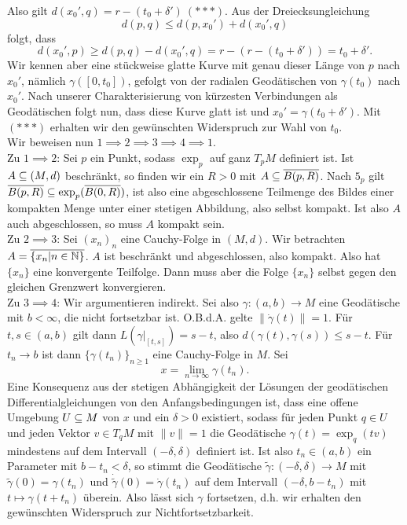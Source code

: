 \begin{beweis}
\begin{equation}
\end{equation}
Also gilt $d(x_0', q) = r - (t_0 + \delta') \ (\ast \ast \ast)$. Aus der Dreiecksungleichung
\begin{equation}
d(p,q) \leq d(p, x_0') + d(x_0', q)
\end{equation}
folgt, dass
\begin{equation}
d(x_0', p) \geq d(p,q)-d(x_0',q) = r-(r-(t_0+\delta')) = t_0 + \delta'.
\end{equation}
Wir kennen aber eine stückweise glatte Kurve mit genau dieser Länge von $p$ nach $x_0'$, nämlich $\gamma([0,t_0])$, gefolgt von der radialen Geodätischen von $\gamma(t_0)$ nach $x_0'$. Nach unserer Charakterisierung von kürzesten Verbindungen als Geodätischen folgt nun, dass diese Kurve glatt ist und $x_0' = \gamma(t_0+\delta')$. Mit $(\ast \ast \ast)$ erhalten wir den gewünschten Widerspruch zur Wahl von $t_0$.\\
Wir beweisen nun $1 \implies 2 \implies 3 \implies 4 \implies 1$.\\
Zu $1 \implies 2$: Sei $p$ ein Punkt, sodass $\exp_p$ auf ganz $T_pM$ definiert ist. Ist $A \subseteq (M,d)$ beschränkt, so finden wir ein $R > 0$ mit $A \subseteq \overline{B(p,R)}$. Nach $5_p$ gilt $\overline{B(p,R)} \subseteq \exp_p(\overline{B(0,R)})$, ist also eine abgeschlossene Teilmenge des Bildes einer kompakten Menge unter einer stetigen Abbildung, also selbst kompakt. Ist also $A$ auch abgeschlossen, so muss $A$ kompakt sein.\\
Zu $2 \implies 3$: Sei $(x_n)_n$ eine Cauchy-Folge in $(M,d)$. Wir betrachten $A = \overline{\{ x_n | n \in \mathbb{N} \}}$. $A$ ist beschränkt und abgeschlossen, also kompakt. Also hat $\{x_n\}$ eine konvergente Teilfolge. Dann muss aber die Folge $\{x_n\}$ selbst gegen den gleichen Grenzwert konvergieren.\\
Zu $3 \implies 4$: Wir argumentieren indirekt. Sei also $\gamma: (a,b) \to M$ eine Geodätische mit $b < \infty$, die nicht fortsetzbar ist. O.B.d.A. gelte $\| \dot{\gamma}(t) \| = 1$. Für $t,s \in (a,b)$ gilt dann $L(\gamma|_{[t,s]}) = s-t$, also $d(\gamma(t), \gamma(s)) \leq s-t$. Für $t_n \to b$ ist dann $\{\gamma(t_n)\}_{n \geq 1}$ eine Cauchy-Folge in $M$. Sei 
\begin{equation}
x = \lim_{n \to \infty} \gamma(t_n).
\end{equation}
Eine Konsequenz aus der stetigen Abhängigkeit der Lösungen der geodätischen Differentialgleichungen von den Anfangsbedingungen ist, dass eine offene Umgebung $U \subseteq M$ von $x$ und ein $\delta > 0$ existiert, sodass für jeden Punkt $q \in U$ und jeden Vektor $v \in T_qM$ mit $\|v\| = 1$ die Geodätische $\gamma(t) = \exp_q(tv)$ mindestens auf dem Intervall $(-\delta, \delta)$ definiert ist. Ist also $t_n \in (a,b)$ ein Parameter mit $b-t_n < \delta$, so stimmt die Geodätische $\tilde{\gamma}:(-\delta, \delta) \to M$ mit $\tilde{\gamma}(0)=\gamma(t_n)$ und $\dot{\tilde{\gamma}}(0) = \dot{\gamma}(t_n)$ auf dem Intervall $(- \delta, b-t_n)$ mit $t \mapsto \gamma(t+t_n)$ überein. Also lässt sich $\gamma$ fortsetzen, d.h. wir erhalten den gewünschten Widerspruch zur Nichtfortsetzbarkeit.\\

\end{beweis}
